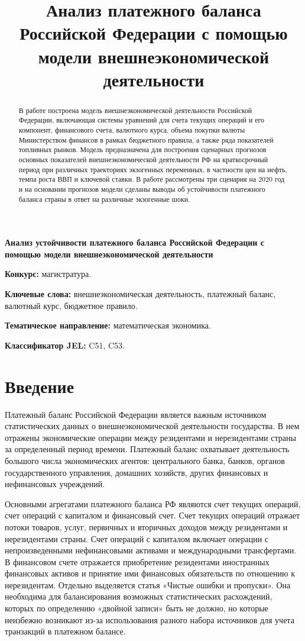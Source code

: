 \documentclass[a4paper, 14pt]{extarticle}
\title{	Анализ платежного баланса Российской Федерации с помощью модели внешнеэкономической деятельности}
\begin{document}
\begin{center}
	{\textbf{Анализ устойчивости платежного баланса Российской Федерации с помощью модели внешнеэкономической деятельности
	}}
\end{center}

{\bf Конкурс:} магистратура.

{\bf Ключевые слова:} внешнеэкономическая деятельность, платежный баланс, валютный курс, бюджетное правило.

\begin{abstract}
	В работе построена модель внешнеэкономической деятельности Российской Федерации, включающая системы уравнений для счета текущих операций и его компонент, финансового счета, валютного курса, объема покупки валюты Министерством финансов в рамках бюджетного правила, а также ряда показателей топливных рынков. Модель предназначена для построения сценарных прогнозов основных показателей внешнеэкономической деятельности РФ на краткосрочный период при различных траекториях экзогенных переменных, в частности цен на нефть, темпа роста ВВП и ключевой ставки. В работе рассмотрены три сценария на $2020$ год и на основании прогнозов модели сделаны выводы об устойчивости платежного баланса страны в ответ на различные экзогенные шоки.
\end{abstract}

{\bf Тематическое направление:} математическая экономика.

{\bf Классификатор JEL:} C51, C53.

\newpage
\section{Введение}
Платежный баланс Российской Федерации является важным источником статистических данных о внешнеэкономической деятельности государства. 
В нем отражены экономические операции между резидентами и нерезидентами страны за определенный период времени. 
Платежный баланс охватывает деятельность большого числа экономических агентов: центрального банка, банков, органов государственного управления, домашних хозяйств, других финансовых и нефинансовых учреждений.

Основными агрегатами платежного баланса РФ являются счет текущих операций, счет операций с капиталом и финансовый счет. 
Счет текущих операций отражает потоки товаров, услуг, первичных и вторичных доходов между резидентами и нерезидентами страны.  
Счет операций с капиталом включает операции с непроизведенными нефинансовыми активами и международными трансфертами. 
В финансовом счете отражается приобретение резидентами иностранных финансовых активов  и принятие ими финансовых обязательств по отношению к нерезидентам.
Отдельно выделяется статья «Чистые ошибки и пропуски».
Она необходима для балансирования возможных статистических расхождений, которых по определению «двойной записи» быть не должно, но которые неизбежно возникают из-за использования разного набора источников для учета транзакций в платежном балансе.
\end{document}
